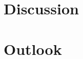 \documentclass[11pt,a4paper,oneside,openany]{scrbook}
\newif\ifaimGerman
\theoremstyle{plain}
\theoremstyle{definition}
\theoremstyle{remark}
\begin{document}
  \part{Discussion}
\fi

\ifaimGerman
  
  
\else
  
  
\fi

\ifaimGerman
  \part{Ausblick}
\else
  \part{Outlook}
\fi

\ifaimGerman
  
  
\else
  
  
\fi
\ifaimGerman
  
\else
  
\fi


\backmatter

\nocite{*}



\printindex
\end{document}
